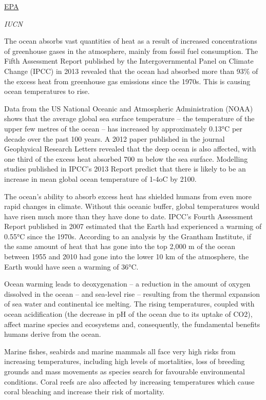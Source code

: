 \documentclass[
]{book}
\begin{document}
\href{https://www.epa.gov/climate-indicators/climate-change-indicators-sea-surface-temperature}{EPA}

\emph{IUCN}

The ocean absorbs vast quantities of heat as a result of increased concentrations of greenhouse gases in the atmosphere, mainly from fossil fuel consumption. The Fifth Assessment Report published by the Intergovernmental Panel on Climate Change (IPCC) in 2013 revealed that the ocean had absorbed more than 93\% of the excess heat from greenhouse gas emissions since the 1970s. This is causing ocean temperatures to rise.

Data from the US National Oceanic and Atmospheric Administration (NOAA) shows that the average global sea surface temperature -- the temperature of the upper few metres of the ocean -- has increased by approximately 0.13°C per decade over the past 100 years. A 2012 paper published in the journal Geophysical Research Letters revealed that the deep ocean is also affected, with one third of the excess heat absorbed 700 m below the sea surface. Modelling studies published in IPCC's 2013 Report predict that there is likely to be an increase in mean global ocean temperature of 1-4oC by 2100.

The ocean's ability to absorb excess heat has shielded humans from even more rapid changes in climate. Without this oceanic buffer, global temperatures would have risen much more than they have done to date. IPCC's Fourth Assessment Report published in 2007 estimated that the Earth had experienced a warming of 0.55°C since the 1970s. According to an analysis by the Grantham Institute, if the same amount of heat that has gone into the top 2,000 m of the ocean between 1955 and 2010 had gone into the lower 10 km of the atmosphere, the Earth would have seen a warming of 36°C.

Ocean warming leads to deoxygenation -- a reduction in the amount of oxygen dissolved in the ocean -- and sea-level rise -- resulting from the thermal expansion of sea water and continental ice melting. The rising temperatures, coupled with ocean acidification (the decrease in pH of the ocean due to its uptake of CO2), affect marine species and ecosystems and, consequently, the fundamental benefits humans derive from the ocean.

Marine fishes, seabirds and marine mammals all face very high risks from increasing temperatures, including high levels of mortalities, loss of breeding grounds and mass movements as species search for favourable environmental conditions. Coral reefs are also affected by increasing temperatures which cause coral bleaching and increase their risk of mortality.
\end{document}
